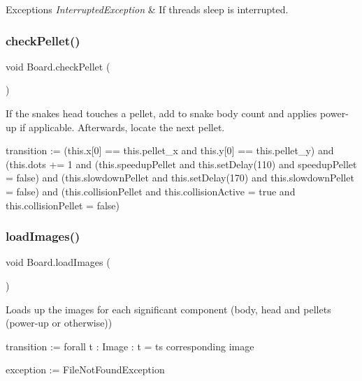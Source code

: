 \begin{DoxyExceptions}{Exceptions}
{\em Interrupted\+Exception} & If thread\textquotesingle{}s sleep is interrupted. \\
\hline
\end{DoxyExceptions}
\mbox{\label{class_board_a1bd348eafebfa5845ff0d8ed9c11f341}} 
\subsubsection{\texorpdfstring{check\+Pellet()}{checkPellet()}}
{\footnotesize\ttfamily void Board.\+check\+Pellet (\begin{DoxyParamCaption}{ }\end{DoxyParamCaption})}

If the snake\textquotesingle{}s head touches a pellet, add to snake body count and applies power-\/up if applicable. Afterwards, locate the next pellet.

transition \+:= (this.\+x\mbox{[}0\mbox{]} == this.\+pellet\+\_\+x and this.\+y\mbox{[}0\mbox{]} == this.\+pellet\+\_\+y) and (this.\+dots += 1 and (this.\+speedup\+Pellet and this.\+set\+Delay(110) and speedup\+Pellet = false) and (this.\+slowdown\+Pellet and this.\+set\+Delay(170) and this.\+slowdown\+Pellet = false) and (this.\+collision\+Pellet and this.\+collision\+Active = true and this.\+collision\+Pellet = false) \mbox{\label{class_board_a2a8e54034cf6e22a174e668b54d57368}} 
\subsubsection{\texorpdfstring{load\+Images()}{loadImages()}}
{\footnotesize\ttfamily void Board.\+load\+Images (\begin{DoxyParamCaption}{ }\end{DoxyParamCaption})}

Loads up the images for each significant component (body, head and pellets (power-\/up or otherwise))

transition \+:= forall t \+: Image \+: t = t\textquotesingle{}s corresponding image

exception \+:= File\+Not\+Found\+Exception \mbox{\label{class_board_a93eeb133b26a224fe23447478700d8c7}} 
